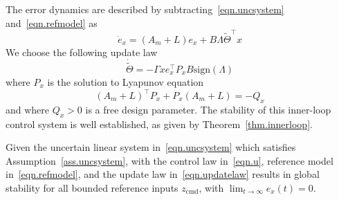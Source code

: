 \documentclass[]{../sty/aiaa-tc}
\theoremstyle{examplestyle}
\begin{document}
  The error dynamics are described by subtracting\ \eqref{eqn.uncsystem} and\ \eqref{eqn.refmodel} as
  \begin{equation}
    \label{eqn.errordynamics}
    \dot{e}_{x} = (A_{m}+L)e_{x} + B\Lambda\widetilde{\Theta}^{\top}x
  \end{equation}
  We choose the following update law
  \begin{equation}
    \label{eqn.updatelaw}
    \dot{\widetilde{\Theta}}=-\Gamma xe_{x}^{\top}P_{x}B\text{sign}(\Lambda)
  \end{equation}
  where $P_{x}$ is the solution to Lyapunov equation
  \begin{equation}
    \label{eqn.lyap}
    (A_{m}+L)^{\top}P_{x} + P_{x}(A_{m}+L) = -Q_{x}
  \end{equation}
  and where $Q_{x}>0$ is a free design parameter.
  The stability of this inner-loop control system is well established, as given by Theorem~\ref{thm.innerloop}.

  \begin{thm-dan}\label{thm.innerloop}
    Given the uncertain linear system in\ \eqref{eqn.uncsystem} which satisfies Assumption~\ref{ass.uncsystem}, with the control law in\ \eqref{eqn.u}, reference model in\ \eqref{eqn.refmodel}, and the update law in\ \eqref{eqn.updatelaw} results in global stability for all bounded reference inputs $z_{\text{cmd}}$, with $\lim_{t\rightarrow\infty}e_{x}(t)=0$.
  \end{thm-dan}
\end{document}
